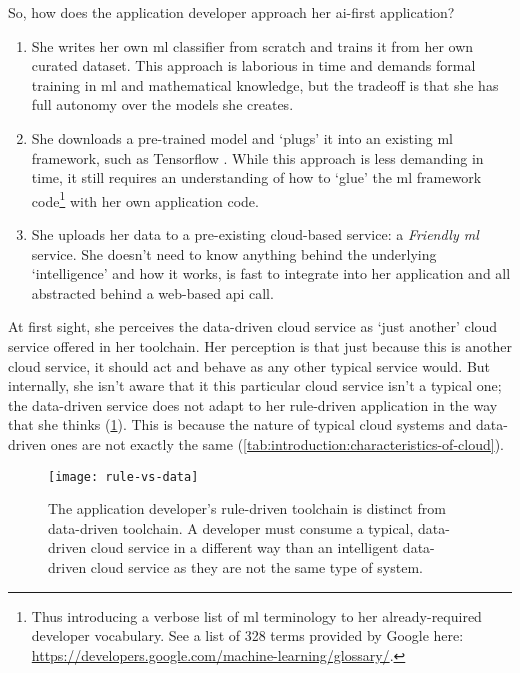 So, how does the application developer approach her \gls{ai}-first application? 

\begin{enumerate}
  \item She writes her own \gls{ml} classifier from scratch and trains it from her own curated dataset. This approach is laborious in time and demands formal training in \gls{ml} and mathematical knowledge, but the tradeoff is that she has full autonomy over the models she creates.
  \item She downloads a pre-trained model and `plugs' it into an existing \gls{ml} framework, such as Tensorflow \citep{Tensorflow:Whitepaper}. While this approach is less demanding in time, it still requires an understanding of how to `glue' the \gls{ml} framework code\footnote{Thus introducing a verbose list of \gls{ml} terminology to her already-required developer vocabulary. See a list of 328 terms provided by Google here: \url{https://developers.google.com/machine-learning/glossary/}.} with her own application code.
  \item She uploads her data to a pre-existing cloud-based service: a \textit{Friendly  \acrlong{ml}} service. She doesn't need to know anything behind the underlying `intelligence' and how it works, is fast to integrate into her application and all abstracted behind a web-based \gls{api} call.
\end{enumerate}

\noindent
At first sight, she perceives the data-driven cloud service as `just another' cloud service  offered in her toolchain. Her perception is that just because this is another cloud service, it should act and behave as any other typical service would. But internally, she isn't aware that it this particular cloud service isn't a typical one; the data-driven service does not adapt to her rule-driven application in the way that she thinks (\cref{fig:introduction:rule-vs-data}). This is because the nature of typical cloud systems and data-driven ones are not exactly the same (\cref{tab:introduction:characteristics-of-cloud}).

\begin{figure}[h!]
\centering
\caption[Data-driven cloud services are not the same as rule-driven ones]{The application developer's rule-driven toolchain is distinct from data-driven toolchain. A developer must consume a typical, data-driven cloud service in a different way than an intelligent data-driven cloud service as they are not the same type of system.}
\label{fig:introduction:rule-vs-data}
\texttt{[image: rule-vs-data]}
\end{figure}

